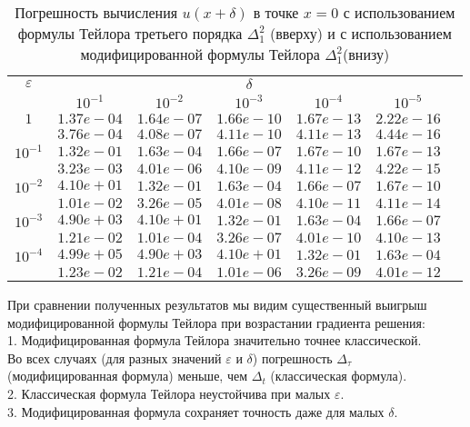 \documentclass[10pt,twoside]{uz_kgu}
\begin{document}
\begin{table} [!htb]
    \caption {{Погрешность вычисления $u(x+ \delta)$ в точке $x=0$ с использованием формулы Тейлора третьего порядка $\Delta_1^2$ (вверху) и с использованием модифицированной формулы Тейлора $\Delta_1^2$(внизу)}}
        \begin{center}
\begin{tabular}{|c|c|c|c|c|c|c}
\cline{1-6} $\varepsilon$ & \multicolumn{5}{c|}{$\delta$} \\
\cline{2-6} &$10^{-1}$ & $10^{-2}$ & $10^{-3}$  & $10^{-4}$& $10^{-5}$\\
\cline{1-6}
$1$
&$1.37e-04$&$1.64e-07$&$1.66e-10$&$1.67e-13$& $2.22e-16$\\
&$3.76e-04$&$4.08e-07$&$4.11e-10$&$4.11e-13$& $4.44e-16$\\
\cline{1-6}
$10^{-1}$
&$1.32e-01$&$1.63e-04$&$1.66e-07$&$1.67e-10$&$1.67e-13$\\
&$3.23e-03$&$4.01e-06$&$4.10e-09$&$4.11e-12$&$4.22e-15$\\
\cline{1-6}
$10^{-2}$
&$4.10e+01$&$1.32e-01$&$1.63e-04$&$1.66e-07$&$1.67e-10$\\
&$1.01e-02$&$3.26e-05$&$4.01e-08$&$4.10e-11$&$4.11e-14$\\
\cline{1-6}
$10^{-3}$
&$4.90e+03$&$4.10e+01$&$1.32e-01$&$1.63e-04$&$1.66e-07$\\
&$1.21e-02$&$1.01e-04$&$3.26e-07$&$4.01e-10$&$4.10e-13$\\
\cline{1-6}
$10^{-4}$
&$4.99e+05$&$4.90e+03$&$4.10e+01$&$1.32e-01$&$1.63e-04$\\
&$1.23e-02$&$1.21e-04$&$1.01e-06$&$3.26e-09$&$4.01e-12$\\
\cline{1-6}
        \end{tabular}
    \end{center}
\end{table}

При сравнении полученных результатов мы видим существенный выигрыш модифицированной формулы Тейлора при возрастании градиента решения:\\
1. Модифицированная формула Тейлора значительно точнее классической.\\
Во всех случаях (для разных значений $\varepsilon$ и $\delta$) погрешность $\Delta_\tau$ (модифицированная формула) меньше,  чем $\Delta_t$ (классическая формула).\\
2. Классическая формула Тейлора неустойчива при малых $\varepsilon.$\\
3. Модифицированная формула сохраняет точность даже для малых $\delta$.\\
\end{document}
